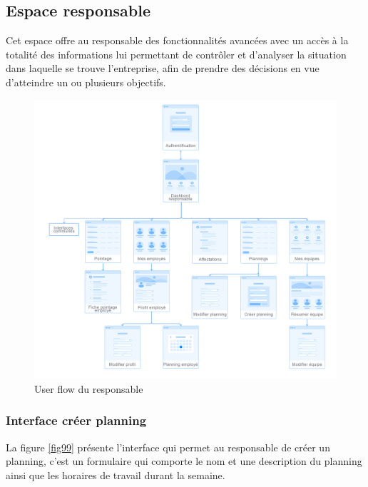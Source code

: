 \subsection{Espace responsable}
Cet espace offre au responsable des fonctionnalités avancées avec un accès à la 
totalité des informations lui permettant de contrôler et d’analyser la situation 
dans laquelle se trouve l’entreprise, afin de prendre des décisions en vue 
d’atteindre un ou plusieurs objectifs.
        
\clearpage
\begin{figure}[h!]
    \centering
    \includegraphics[scale=0.3]{images/interface/Espace responsable.png}
    \caption{User flow du responsable}
    \label{fig98}
 \end{figure}
        
\subsubsection*{Interface créer planning}
La figure \ref{fig99} présente l'interface qui permet au responsable de créer 
un planning, c'est un formulaire qui comporte le nom et une description du 
planning ainsi que les horaires de travail durant la semaine.
            
\clearpage
            
